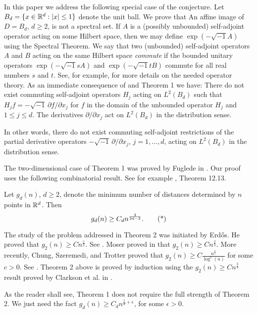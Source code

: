 In this paper we address the following special case of 
the conjecture. Let $B_d=\{x \in {\Bbb R}^d: |x| \leq 1 \}$ 
denote the unit 
ball. We prove that 
 An affine image of $D=B_{d}$, $d \ge 2$, is not a 
spectral set.
\endproclaim 
If $A$ is a (possibly unbounded) 
self-adjoint operator acting on some Hilbert space, then we
may define $\exp\left(-\sqrt{-1}A\right)$ using the Spectral Theorem. We
say that two (unbounded) self-adjoint operators $A$ and $B$ acting on 
the same
Hilbert space {\it commute} if the bounded unitary operators 
$\exp\left(-\sqrt{-1}sA\right)$ and $\exp\left(-\sqrt{-1}tB\right)$
commute for all real numbers $s$ and $t$. See, for example, \cite{ReSi}
for more details on the needed operator theory.
As an immediate consequence of \cite{Fug} and Theorem 1 we have:
There do not exist commuting self-adjoint operators $H_j$ acting on
$L^2(B_d)$ such that 
$H_jf=-\sqrt{-1}\,\partial f/\partial x_j$ for $f$ in the domain
of the unbounded operator $H_j$ and $1\leq j\leq d$. 
The derivatives $\partial /\partial x_j$ act on $L^2(B_d)$ in the 
distribution sense.
\endproclaim

In other words, there do not exist commuting self-adjoint restrictions of
the partial derivative operators 
$-\sqrt{-1}\,\partial /\partial x_j$, $j=1,\ldots,d$,
acting on $L^2(B_d)$ in the distribution sense.

The two-dimensional case of Theorem 1 was proved by Fuglede in 
\cite{Fug}. Our proof uses the following combinatorial result. 
See for example \cite{AgPa}, Theorem 12.13. 

 Let $g_d(n)$, $d \ge 2$, denote the minimum number of 
distances determined by $n$ points in ${\Bbb R}^d$. Then 
$$ g_d(n) \ge C_d n^{\frac{3}{3d-2}}. \tag*$$ 
\endproclaim 

 The study of the problem addressed in Theorem 2 was 
initiated by Erd\H os. He proved that $g_2(n) \ge Cn^{\frac{1}{2}}$. 
See \cite{Erd}. Moser proved in \cite{Mos} that $g_2(n) \ge 
Cn^{\frac{2}{3}}$. More recently, Chung, Szeremedi, and Trotter proved 
that $g_2(n) \ge C\frac{n^{\frac{4}{5}}}{\log^c(n)}$ for some $c>0$. 
See \cite{CST}. Theorem 2 above is proved by induction using the $g_2(n) 
\ge Cn^{\frac{3}{4}}$ result proved by Clarkson et al. in \cite{C}. 

As the reader shall see, Theorem 1 does not require the full strength of 
Theorem 2. We just need the fact $g_d(n) \ge C_dn^{\frac{1}{d}+\epsilon}$, 
for some $\epsilon>0$.    
\endremark 

